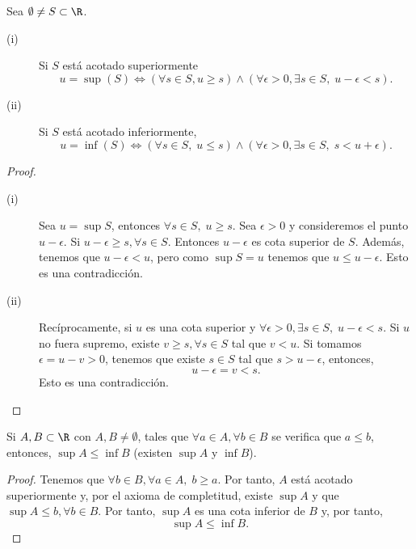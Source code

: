 \begin{fprop}[]
\normalfont Sea $\displaystyle \emptyset \neq S \subset \R $. 
\begin{description}
\item[(i)] Si $\displaystyle S $ está acotado superiormente
	\[u = \sup\left(S\right) \iff (\forall s \in S, u \geq s) \land (\forall \epsilon > 0, \exists s \in S, \; u - \epsilon < s)  .\]
\item[(ii)] Si $\displaystyle S $ está acotado inferiormente, 
	\[u = \inf\left(S\right) \iff \left(\forall s \in S, \; u \leq s\right) \land \left(\forall \epsilon>0, \exists s \in S, \; s < u + \epsilon\right) .\]
\end{description}
\end{fprop}

\begin{proof}
\begin{description}
\item[(i)] Sea $\displaystyle u = \sup S $, entonces $\displaystyle \forall s \in S, \; u \geq s $. Sea $\displaystyle  \epsilon>0 $ y consideremos el punto $\displaystyle u - \epsilon $. Si $\displaystyle u - \epsilon \geq s, \forall s \in S $. Entonces $\displaystyle u-\epsilon  $ es cota superior de $\displaystyle S $. Además, tenemos que $\displaystyle u - \epsilon < u $, pero como $\displaystyle \sup S = u $ tenemos que $\displaystyle u \leq u - \epsilon  $. Esto es una contradicción. 
\item[(ii)] Recíprocamente, si $\displaystyle u $ es una cota superior y $\displaystyle \forall \epsilon>0, \exists s \in S, \; u - \epsilon < s $. Si $\displaystyle u $ no fuera supremo, existe $\displaystyle v \geq s, \forall s \in S $ tal que $\displaystyle v < u $. Si tomamos $\displaystyle \epsilon = u - v > 0 $, tenemos que existe $\displaystyle s \in S $ tal que $\displaystyle s > u - \epsilon $, entonces,
\[ u - \epsilon = v < s .\]
Esto es una contradicción.
\end{description}
\end{proof}

\begin{fprop}[]
\normalfont Si $\displaystyle A, B \subset \R $ con $\displaystyle A, B \neq \emptyset $, tales que $\displaystyle \forall a \in A, \forall b \in B $ se verifica que $\displaystyle a\leq b $, entonces, $\displaystyle \sup A \leq \inf B $ (existen $\displaystyle \sup A $ y $\displaystyle \inf B $).
\end{fprop}

\begin{proof}
Tenemos que $\displaystyle \forall b \in B, \forall a \in A, \; b \geq a $. Por tanto, $\displaystyle A $ está acotado superiormente y, por el axioma de completitud, existe $\displaystyle \sup A $ y que $\displaystyle \sup A \leq b, \forall b \in B $. Por tanto, $\displaystyle \sup A $ es una cota inferior de $\displaystyle B $ y, por tanto, 
\[\sup A \leq \inf B .\]
\end{proof}

